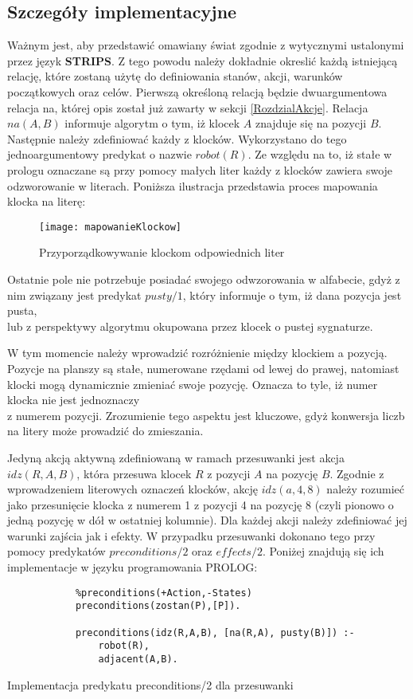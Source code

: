     \subsection{Szczegóły implementacyjne}
    Ważnym jest, aby przedstawić omawiany świat zgodnie z wytycznymi ustalonymi przez język \textbf{STRIPS}. Z tego powodu należy dokładnie okreslić 
    każdą istniejącą relację, które zostaną użytę do definiowania stanów, akcji, warunków początkowych oraz celów. 
    Pierwszą określoną relacją będzie dwuargumentowa relacja na, której opis został już zawarty w sekcji \ref{RozdzialAkcje}.
    Relacja $na(A,B)$ informuje algorytm o tym, iż klocek $A$ znajduje się na pozycji $B$. Następnie należy zdefiniować każdy z klocków. 
    Wykorzystano do tego jednoargumentowy predykat o nazwie $robot(R)$. Ze względu na to, iż stałe w prologu oznaczane są przy pomocy 
    małych liter każdy z klocków zawiera swoje odzworowanie w literach. Poniższa ilustracja przedstawia proces mapowania klocka na literę:

    \begin{figure}[H]
        \texttt{[image: mapowanieKlockow]}
        \centering
        \caption{Przyporządkowywanie klockom odpowiednich liter}
    \end{figure}
    Ostatnie pole nie potrzebuje posiadać swojego odwzorowania w alfabecie, gdyż z nim związany jest predykat $pusty/1$, który informuje o tym, 
    iż dana pozycja jest pusta, \\
    lub z perspektywy algorytmu okupowana przez klocek o pustej sygnaturze. 

    W tym momencie należy wprowadzić rozróżnienie między klockiem a pozycją. Pozycje na planszy są stałe, numerowane rzędami od lewej do prawej,
    natomiast klocki mogą dynamicznie zmieniać swoje pozycję. Oznacza to tyle, iż numer klocka nie jest jednoznaczy \\ 
    z numerem pozycji. 
    Zrozumienie tego aspektu jest kluczowe, gdyż konwersja liczb na litery może prowadzić do zmieszania. 

    Jedyną akcją aktywną zdefiniowaną w ramach przesuwanki jest akcja $idz(R,A,B)$, która przesuwa klocek $R$ z pozycji $A$ na pozycję $B$.
    Zgodnie z wprowadzeniem literowych oznaczeń klocków, akcję $idz(a,4,8)$ należy rozumieć jako przesunięcie klocka z numerem 1 z pozycji 4 
    na pozycję 8 (czyli pionowo o jedną pozycję w dół w ostatniej kolumnie). Dla każdej akcji należy zdefiniować jej warunki zajścia jak i efekty.
    W przypadku przesuwanki dokonano tego przy pomocy predykatów $preconditions/2$ oraz $effects/2$. Poniżej znajdują się ich implementacje 
    w języku programowania PROLOG:
    \begin{listing}[H]
        \begin{verbatim}
            %preconditions(+Action,-States)
            preconditions(zostan(P),[P]).

            preconditions(idz(R,A,B), [na(R,A), pusty(B)]) :-
                robot(R), 
                adjacent(A,B).
        \end{verbatim}
    \caption{Implementacja predykatu preconditions/2 dla przesuwanki}
    \end{listing}


